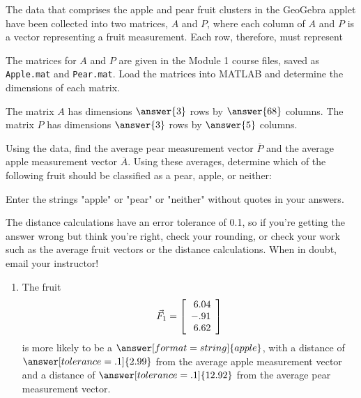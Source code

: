 \documentclass{ximera}
\author{Zack Reed}
\begin{document}
\begin{exercise}

The data that comprises the apple and pear fruit clusters in the GeoGebra applet have been collected into two matrices, $A$ and $P$, where each column of $A$ and $P$ is a vector representing a fruit measurement. Each row, therefore, must represent

\begin{multipleChoice}
\end{multipleChoice}

The matrices for $A$ and $P$ are given in the Module 1 course files, saved as \texttt{Apple.mat} and \texttt{Pear.mat}. Load the matrices into MATLAB and determine the dimensions of each matrix.

The matrix $A$ has dimensions $\answer{3}$ rows by $\answer{68}$ columns. The matrix $P$ has dimensions $\answer{3}$ rows by $\answer{5}$ columns.

Using the data, find the average pear measurement vector $\overline{P}$ and the average apple measurement vector $\overline{A}$. Using these averages, determine which of the following fruit should be classified as a pear, apple, or neither:

\begin{hint}
  Enter the strings "apple" or "pear" or "neither" without quotes in your answers.
  
  The distance calculations have an error tolerance of 0.1, so if you're getting the answer wrong but think you're right, check your rounding, or check your work such as the average fruit vectors or the distance calculations. When in doubt, email your instructor!
\end{hint}

\begin{enumerate}
\item
The fruit
\begin{equation*}
  \vec{F}_1=\startmat{r}
    6.04 \\
    -.91 \\
    6.62
  \stopmat
\end{equation*}
is more likely to be a $\answer[format=string]{apple}$, with a distance of $\answer[tolerance=.1]{2.99}$ from the average apple measurement vector and a distance of $\answer[tolerance=.1]{12.92}$ from the average pear measurement vector.


\end{enumerate}
\end{exercise}
\end{document}
